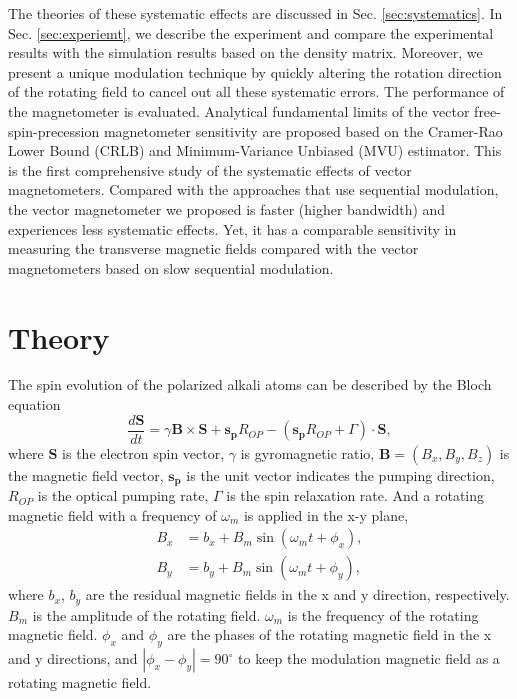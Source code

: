 \documentclass[prx,twocolumn,10pt,nofootinbib]{revtex4-1}
\begin{document}
The theories of these systematic effects are discussed in Sec. \ref{sec:systematics}. In Sec. \ref{sec:experiemt}, we describe the experiment and compare the experimental results with the simulation results based on the density matrix. Moreover, we present a unique modulation technique by quickly altering the rotation direction of the rotating field to cancel out all these systematic errors. The performance of the magnetometer is evaluated. Analytical fundamental limits of the vector free-spin-precession magnetometer sensitivity are proposed based on the Cramer-Rao Lower Bound (CRLB) and Minimum-Variance Unbiased (MVU) estimator. This is the first comprehensive study of the systematic effects of vector magnetometers. Compared with the approaches that use sequential modulation, the vector magnetometer we proposed is faster (higher bandwidth) and experiences less systematic effects. Yet, it has a comparable sensitivity in measuring the transverse magnetic fields compared with the vector magnetometers based on slow sequential modulation.

\section{Theory}\label{sec:Theory}

The spin evolution of the polarized alkali atoms can be described by the Bloch equation \cite{bloch1946nuclear}
\begin{equation}
  \frac{d\bm{S}}{dt} = \gamma \bm{B}\times \bm{S} +\bm{s_{p}} R_{OP} -(\bm{s_{p}} R_{OP}+\Gamma) \cdot \bm {S},
\end{equation}
where $\bm{S}$ is the electron spin vector, $\gamma$ is gyromagnetic ratio, $\bm{B}=(B_x,B_y,B_z)$ is the magnetic field vector, $\bm{s_{p}}$ is the unit vector indicates the pumping direction, $R_{OP}$ is the optical pumping rate, $\Gamma$ is the spin relaxation rate. And a rotating magnetic field with a frequency of $\omega_m$ is applied in the x-y plane,
\begin{equation}
\begin{aligned}
	B_x &= b_x + B_m \sin(\omega_m t + \phi_x),\\
	B_y &= b_y + B_m \sin(\omega_m t + \phi_y),
	\label{eq:mod_field}
	\end{aligned}
\end{equation}
where $b_x$, $b_y$ are the residual magnetic fields in the x and y direction, respectively. $B_m$ is the amplitude of the rotating field. $\omega_m$ is the frequency of the rotating magnetic field. $\phi_x$ and $\phi_y$ are the phases of the rotating magnetic field in the x and y directions, and  $|\phi_x-\phi_y|=90^\circ$ to keep the modulation magnetic field as a rotating magnetic field.
\end{document}
